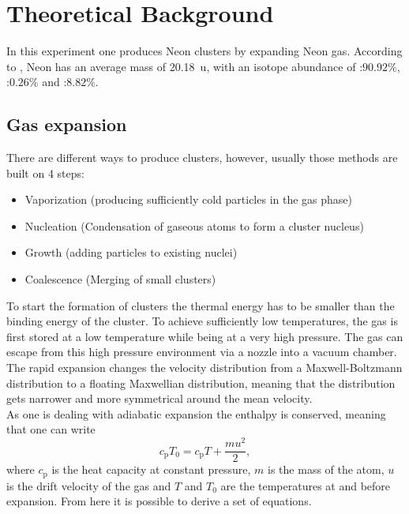 \documentclass[a4paper,10pt]{article}
\begin{document}
\section{Theoretical Background}
In this experiment one produces Neon clusters by expanding Neon gas. According to \cite{script}, Neon has an average mass of \SI{20.18}{\atomicmassunit}, with an isotope abundance of :$90.92\%$, :$0.26\%$ and :$8.82\%$.

\subsection{Gas expansion}
There are different ways to produce clusters, however, usually those methods are built on 4 steps:
\begin{itemize}
	\item Vaporization (producing sufficiently cold particles in the gas phase)
	\item Nucleation (Condensation of gaseous atoms to form a cluster nucleus)
	\item Growth (adding particles to existing nuclei)
	\item Coalescence (Merging of small clusters)
\end{itemize}
To start the formation of clusters the thermal energy has to be smaller than the binding energy of the cluster. To achieve sufficiently low temperatures, the gas is first stored at a low temperature while being at a very high pressure. The gas can escape from this high pressure environment via a nozzle into a vacuum chamber. The rapid expansion changes the velocity distribution from a Maxwell-Boltzmann distribution to a floating Maxwellian distribution, meaning that the distribution gets narrower and more symmetrical around the mean velocity. \\
As one is dealing with adiabatic expansion the enthalpy is conserved, meaning that one can write
\begin{equation}
	c_\mathrm{p} T_0 = c_\mathrm{p} T + \frac{m u^2}{2},
\end{equation}
where $c_\mathrm{p}$ is the heat capacity at constant pressure, $m$ is the mass of the atom, $u$ is the drift velocity of the gas and $T$ and $T_0$ are the temperatures at and before expansion. From here it is possible to derive a set of equations.
\end{document}
